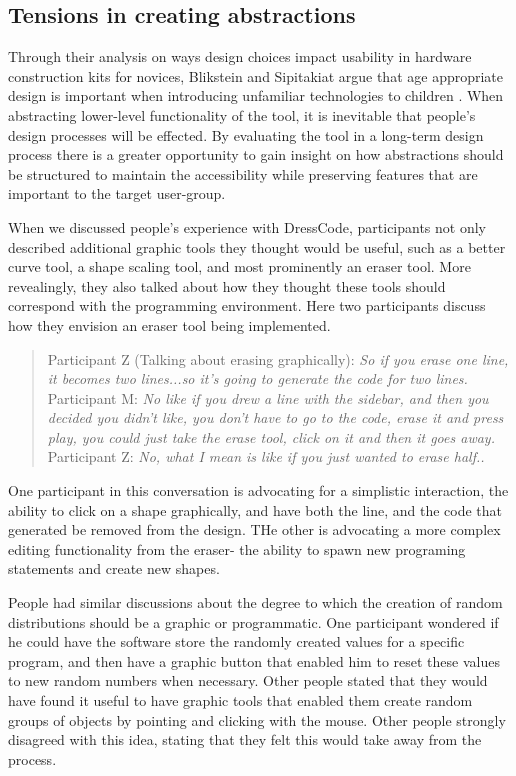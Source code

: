 \documentclass{sigchi}
\begin{document}
\subsection{Tensions in creating abstractions }
Through their analysis on ways design choices impact usability in hardware construction kits for novices, Blikstein and Sipitakiat argue that age appropriate design is important when introducing unfamiliar technologies to children \cite{blik}. When abstracting lower-level functionality of the tool, it is inevitable that people's design processes will be effected. By evaluating the tool in a long-term design process there is a greater opportunity to gain insight on how abstractions should be structured to maintain the accessibility while preserving features that are important to the target user-group. 

When we discussed people's experience with DressCode, participants not only described additional graphic tools they thought would be useful, such as a better curve tool, a shape scaling tool, and most prominently an eraser tool. More revealingly, they also talked about how they thought these tools should correspond with the programming environment. Here two participants discuss how they envision an eraser tool being implemented.

\begin{quotation}
Participant Z (Talking about erasing graphically): \textit{So if you erase one line, it becomes two lines...so it's going to generate the code for two lines.}
Participant M: \textit{No like if you drew a line with the sidebar, and then you decided you didn't like, you don't have to go to the code, erase it and press play, you could just take the erase tool, click on it and then it goes away.}
Participant Z:  \textit{No, what I mean is like if you just wanted to erase half..}
\end{quotation}

One participant in this conversation is advocating for a simplistic interaction, the ability to click on a shape graphically, and have both the line, and the code that generated be removed from the design. THe other is advocating a more complex editing functionality from the eraser- the ability to spawn new programing statements and create new shapes. 

People had similar discussions about the degree to which the creation of random distributions should be a graphic or programmatic. One participant wondered if he could have the software store the randomly created values for a specific program, and then have a graphic button that enabled him to reset these values to new random numbers when necessary. Other people stated that they would have found it useful to have graphic tools that enabled them create random groups of objects by pointing and clicking with the mouse. Other people strongly disagreed with this idea, stating that they felt this would take away from the process.
\end{document}
